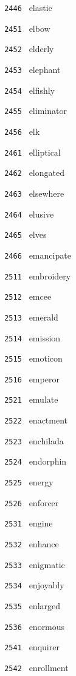 \documentclass[11pt]{article}
\begin{document}
\begin{multicols}{6}
\noindent \texttt{ 2446 } elastic  \par
\noindent \texttt{ 2451 } elbow  \par
\noindent \texttt{ 2452 } elderly  \par
\noindent \texttt{ 2453 } elephant  \par
\noindent \texttt{ 2454 } elfishly  \par
\noindent \texttt{ 2455 } eliminator  \par
\noindent \texttt{ 2456 } elk  \par
\noindent \texttt{ 2461 } elliptical  \par
\noindent \texttt{ 2462 } elongated  \par
\noindent \texttt{ 2463 } elsewhere  \par
\noindent \texttt{ 2464 } elusive  \par
\noindent \texttt{ 2465 } elves  \par
\noindent \texttt{ 2466 } emancipate  \par
\noindent \texttt{ 2511 } embroidery  \par
\noindent \texttt{ 2512 } emcee  \par
\noindent \texttt{ 2513 } emerald  \par
\noindent \texttt{ 2514 } emission  \par
\noindent \texttt{ 2515 } emoticon  \par
\noindent \texttt{ 2516 } emperor  \par
\noindent \texttt{ 2521 } emulate  \par
\noindent \texttt{ 2522 } enactment  \par
\noindent \texttt{ 2523 } enchilada  \par
\noindent \texttt{ 2524 } endorphin  \par
\noindent \texttt{ 2525 } energy  \par
\noindent \texttt{ 2526 } enforcer  \par
\noindent \texttt{ 2531 } engine  \par
\noindent \texttt{ 2532 } enhance  \par
\noindent \texttt{ 2533 } enigmatic  \par
\noindent \texttt{ 2534 } enjoyably  \par
\noindent \texttt{ 2535 } enlarged  \par
\noindent \texttt{ 2536 } enormous  \par
\noindent \texttt{ 2541 } enquirer  \par
\noindent \texttt{ 2542 } enrollment  \par

\end{multicols}
\end{document}
